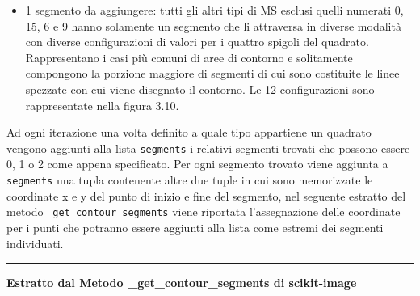 \documentclass[12pt,a4paper]{report}
\begin{document}
\begin{itemize}
\item 1 segmento da aggiungere: tutti gli altri tipi di MS esclusi quelli numerati 0, 15, 6 e 9 hanno solamente un segmento che li attraversa in diverse modalità con diverse configurazioni di valori per i quattro spigoli del quadrato.  Rappresentano i casi più comuni di aree di contorno e   solitamente compongono la porzione maggiore di segmenti di cui sono costituite le linee spezzate con cui viene disegnato il contorno. Le 12 configurazioni sono rappresentate nella figura 3.10.
\begin{figure}[H]
\centering
\begin{floatrow}[1]
\end{floatrow}
\end{figure}

\end{itemize}
Ad ogni iterazione una volta definito a quale tipo appartiene un quadrato vengono aggiunti alla lista \verb|segments| i relativi segmenti trovati che possono essere 0, 1 o 2 come appena specificato.  Per ogni segmento trovato viene aggiunta a  \verb|segments| una tupla contenente altre due tuple in cui sono memorizzate le coordinate x e y del punto di inizio e fine del segmento, nel seguente estratto del metodo  \verb|_get_contour_segments| viene riportata l'assegnazione delle coordinate per i punti che potranno essere aggiunti alla lista come estremi dei segmenti individuati.\newpage
\noindent\rule[0.5ex]{\linewidth}{2pt}
\small{\textbf{Estratto dal Metodo \_get\_contour\_segments di scikit-image}} \\
\end{document}
